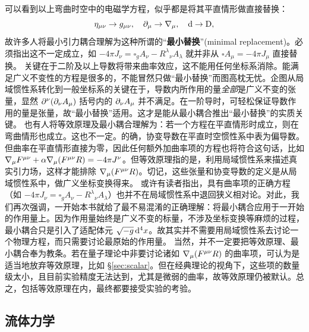 可以看到以上弯曲时空中的电磁学方程，似乎都是将其平直情形做直接替换：
\[
    \eta_{\mu\nu}\to g_{\mu\nu},\quad\p_\mu\to\cd_\mu,\quad\d\to\D,
\]
故许多人将最小引力耦合理解为这种所谓的“\textbf{最小替换}”(minimal replacement)。必须指出这不一定成立，如 $-4\pi J_\nu=\square_g A_\nu- R^\lambda{}_{\nu} A_\lambda$ 就并非从 $\square A_\mu =-4\pi J_\mu$ 直接替换。
关键在于二阶及以上导数将带来曲率效应，这不能用任何坐标系消除。能满足广义不变性的方程是很多的，不能冒然只做“最小替换”而图高枕无忧。企图从局域惯性系转化到一般坐标系的关键在于，导数内所作用的量\emph{全部}是广义不变的张量，显然 $\partial^\nu(\partial_\nu A_\mu)$ 括号内的 $\partial_\nu A_\mu$ 并不满足。在一阶导时，可轻松保证导数作用的量是张量，故“最小替换”适用。这才是能从最小耦合推出“最小替换”的实质关键。
也有人将等效原理及最小耦合理解为：若一个方程在平直情形时成立，则在弯曲情形也成立。这也不一定。的确，协变导数在平直时空惯性系中表为偏导数。但曲率在平直情形直接为零，因此任何额外加曲率项的方程也将符合这句话，比如 $\nabla_\mu F^{\mu\nu}+\alpha \nabla_\mu(F^{\mu\nu}R)=-4 \pi J^\nu$。但等效原理指的是，利用局域惯性系来描述真实引力场，这样才能排除 $\nabla_\mu(F^{\mu\nu}R)$。切记，这些张量和协变导数的定义是从局域惯性系中，做广义坐标变换得来。
或许有读者指出，具有曲率项的正确方程（如 $-4\pi J_\nu=\square_g A_\nu- R^\lambda{}_{\nu} A_\lambda$）也并不在局域惯性系中退回狭义相对论。对此，我们再次强调，一开始本书就给了最不易混淆的正确理解：将最小耦合应用于一开始的作用量上。因为作用量始终是广义不变的标量，不涉及坐标变换等麻烦的过程，最小耦合只是引入了适配体元 $\sqrt{-g}\dd[4]{x}$。故其实并不需要用局域惯性系去讨论一个物理方程，而只需要讨论最原始的作用量。
当然，并不一定要把等效原理、最小耦合奉为教条。若在量子理论中非要讨论诸如 $\nabla_\mu(F^{\mu\nu}R)$ 的曲率项，可认为是适当地放弃等效原理，比如 \S\ref{sec:scalar}。但在经典理论的视角下，这些项的数量级太小，且目前实验精度无法达到，尤其是微弱的曲率，故等效原理仍被默认。总之，包括等效原理在内，最终都要接受实验的考验。

\subsection{流体力学}

